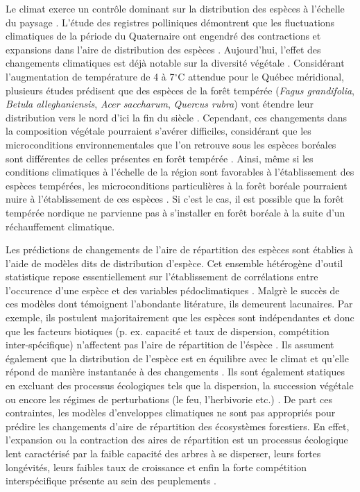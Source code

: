 Le climat exerce un contrôle dominant sur la distribution des espèces à l'échelle du paysage
\citep{Pearson2003b}. L'étude des registres polliniques démontrent que les fluctuations climatiques
de la période du Quaternaire ont engendré des contractions et expansions dans l'aire de distribution
des espèces \citep{Davis2001}. Aujourd'hui, l'effet des changements climatiques est déjà notable sur
la diversité végétale \citep{Walther2002a,Parmesan2006}. Considérant l'augmentation de température
de 4 à 7$^\circ$C \citep[Scénario RCP 8.5]{Climatique2015} attendue pour le Québec méridional,
plusieurs études prédisent que des espèces de la forêt tempérée (\textit{Fagus grandifolia},
\textit{Betula alleghaniensis}, \textit{Acer saccharum}, \textit{Quercus rubra}) vont étendre leur
distribution vers le nord d'ici la fin du siècle \citep{Iverson2002,Sciences2014}. Cependant, ces
changements dans la composition végétale pourraient s'avérer difficiles, considérant que les
microconditions environnementales que l’on retrouve sous les espèces boréales sont différentes de
celles présentes en forêt tempérée \citep{Barras1998,Caspersen2005}. Ainsi, même si les conditions
climatiques à l'échelle de la région sont favorables à l'établissement des espèces tempérées, les
microconditions particulières à la forêt boréale pourraient nuire à l'établissement de ces espèces \citep{DeFrenne2013,Lafleur2010}. Si c’est le cas, il est possible que la forêt tempérée
nordique ne parvienne pas à s'installer en forêt boréale à la suite d’un réchauffement climatique.

Les prédictions de changements de l'aire de répartition des espèces sont établies à l'aide de modèles dits de distribution d'espèce. Cet ensemble hétérogène d'outil statistique repose essentiellement sur l'établissement de corrélations entre l'occurence d'une espèce et des variables pédoclimatiques \citep{Pearson2003b, Guisan2005a}.
Malgrè le succès de ces modèles dont témoignent l'abondante litérature, ils demeurent lacunaires. Par exemple, ils postulent majoritairement que les espèces sont indépendantes et donc que les facteurs biotiques (p. ex. capacité et taux de dispersion, compétition inter-spécifique) n'affectent pas l'aire de répartition de l'éspèce \citep{Guisan2005a,Pearson2003b}. Ils assument également que la
distribution de l'espèce est en équilibre avec le climat et qu'elle répond de manière instantanée à
des changements \citep{Austin2002}. Ils sont également statiques en excluant des processus
écologiques tels que la dispersion, la succession végétale ou encore les régimes de perturbations
(le feu, l'herbivorie etc.) \citep{Austin2002,Guisan2005a}. De part ces contraintes, les
modèles d'enveloppes climatiques ne sont pas appropriés pour prédire les changements d'aire de
répartition des écosystèmes forestiers. En effet, l'expansion ou la contraction des aires de
répartition est un processus écologique lent caractérisé par la faible capacité des arbres à se
disperser, leurs fortes longévités, leurs faibles taux de croissance et enfin la forte compétition
interspécifique présente au sein des peuplements \citep{Renwick2014,Vanderwel2014}.

